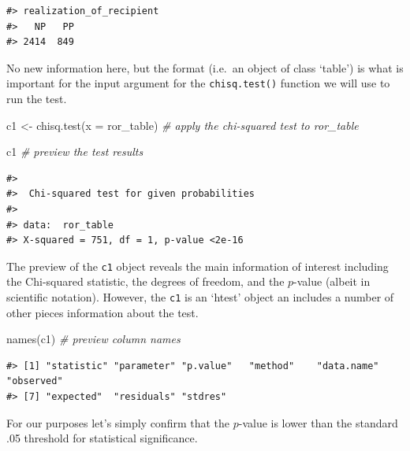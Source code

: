 \documentclass[
  letterpaper,
]{scrbook}
\newenvironment{Shaded}{\begin{snugshade}}{\end{snugshade}}
\newcommand{\AttributeTok}[1]{\textcolor[rgb]{0.00,0.00,0.00}{#1}}
\newcommand{\CommentTok}[1]{\textcolor[rgb]{0.00,0.00,0.00}{\textit{#1}}}
\newcommand{\DecValTok}[1]{\textcolor[rgb]{0.00,0.00,0.00}{#1}}
\newcommand{\FunctionTok}[1]{\textcolor[rgb]{0.00,0.00,0.00}{#1}}
\newcommand{\NormalTok}[1]{\textcolor[rgb]{0.00,0.00,0.00}{#1}}
\newcommand{\OtherTok}[1]{\textcolor[rgb]{0.00,0.00,0.00}{#1}}
\newcommand{\SpecialCharTok}[1]{\textcolor[rgb]{0.00,0.00,0.00}{#1}}
\begin{document}
\begin{verbatim}
#> realization_of_recipient
#>   NP   PP 
#> 2414  849
\end{verbatim}

No new information here, but the format (i.e.~an object of class
`table') is what is important for the input argument for the
\texttt{chisq.test()} function we will use to run the test.

\begin{Shaded}
\begin{Highlighting}[]
\NormalTok{c1 }\OtherTok{\textless{}{-}} \FunctionTok{chisq.test}\NormalTok{(}\AttributeTok{x =}\NormalTok{ ror\_table) }\CommentTok{\# apply the chi{-}squared test to \textasciigrave{}ror\_table\textasciigrave{}}

\NormalTok{c1 }\CommentTok{\# preview the test results}
\end{Highlighting}
\end{Shaded}

\begin{verbatim}
#> 
#>  Chi-squared test for given probabilities
#> 
#> data:  ror_table
#> X-squared = 751, df = 1, p-value <2e-16
\end{verbatim}

The preview of the \texttt{c1} object reveals the main information of
interest including the Chi-squared statistic, the degrees of freedom,
and the \(p\)-value (albeit in scientific notation). However, the
\texttt{c1} is an `htest' object an includes a number of other pieces
information about the test.

\begin{Shaded}
\begin{Highlighting}[]
\FunctionTok{names}\NormalTok{(c1) }\CommentTok{\# preview column names}
\end{Highlighting}
\end{Shaded}

\begin{verbatim}
#> [1] "statistic" "parameter" "p.value"   "method"    "data.name" "observed" 
#> [7] "expected"  "residuals" "stdres"
\end{verbatim}

For our purposes let's simply confirm that the \(p\)-value is lower than
the standard .05 threshold for statistical significance.

\begin{Shaded}
\end{Shaded}
\end{document}

